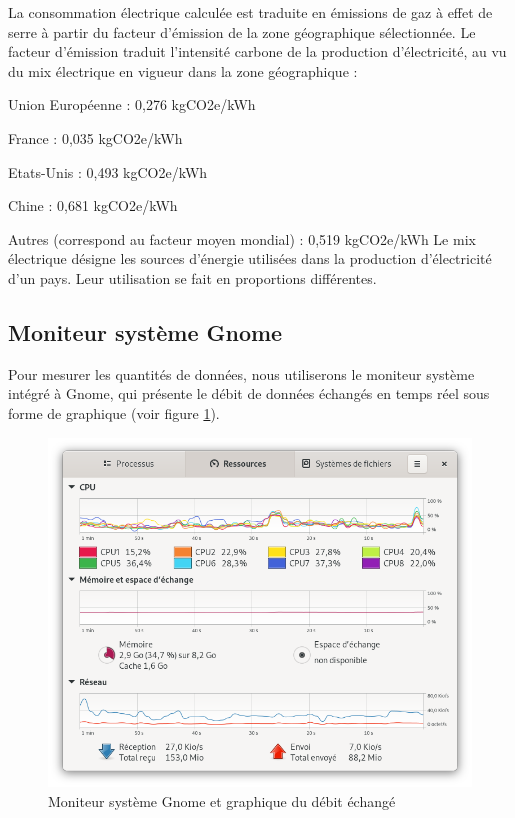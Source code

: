 \documentclass[11pt,a4paper]{report}
\begin{document}
La consommation électrique calculée est traduite en émissions de gaz à effet de serre à partir du facteur d'émission de la zone géographique sélectionnée. Le facteur d'émission traduit l'intensité carbone de la production d'électricité, au vu du mix électrique en vigueur dans la zone géographique :
\bi \item Union Européenne : 0,276 kgCO2e/kWh
\item France : 0,035 kgCO2e/kWh
\item Etats-Unis : 0,493 kgCO2e/kWh
\item Chine : 0,681 kgCO2e/kWh
\item Autres (correspond au facteur moyen mondial) : 0,519 kgCO2e/kWh \ei
{} Le mix électrique désigne les sources d'énergie utilisées dans la production d'électricité d'un pays. Leur utilisation se fait en proportions différentes. \eb

\subsection{Moniteur système Gnome}
Pour mesurer les quantités de données, nous utiliserons le moniteur système intégré à Gnome, qui présente le débit de données échangés en temps réel sous forme de graphique (voir figure \ref{fig:gnome}).

\begin{figure}[!h]
    \centering
    \includegraphics[scale=0.3]{capture_moniteur_sys.png}
    \caption{Moniteur système Gnome et graphique du débit échangé}
     \label{fig:gnome}
\end{figure}
\end{document}
